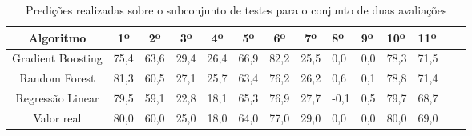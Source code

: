 \begin{table}[!htb]
    \centering
    \caption{Predições realizadas sobre o subconjunto de testes para o conjunto de duas avaliações}
    \begin{tabular}{ccccccccllllll}
        \hline
        \textbf{Algoritmo} & \textbf{1º} & \textbf{2º} & \textbf{3º} & \textbf{4º} & \textbf{5º} & \textbf{6º} & \textbf{7º} & \textbf{8º} & \textbf{9º} & \textbf{10º} & \textbf{11º} \\ \hline
        Gradient Boosting & 75,4 & 63,6 & 29,4 & 26,4 & 66,9 & 82,2 & 25,5 & 0,0 & 0,0 & 78,3 & 71,5 \\
        Random Forest & 81,3 & 60,5 & 27,1 & 25,7 & 63,4 & 76,2 & 26,2 & 0,6 & 0,1 & 78,8 & 71,4 \\
        Regressão Linear & 79,5 & 59,1 & 22,8 & 18,1 & 65,3 & 76,9 & 27,7 & -0,1 & 0,5 & 79,7 & 68,7 \\
        Valor real & 80,0 & 60,0 & 25,0 & 18,0 & 64,0 & 77,0 & 29,0 & 0,0 & 0,0 & 80,0 & 69,0 \\ \hline
    \end{tabular}
    \label{tab:teste-2}
\end{table}